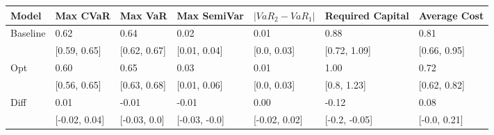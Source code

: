 \begin{tabular}{lllllll}
\toprule
   Model &      Max CVaR &      Max VaR &   Max SemiVar & $|VaR_2 - VaR_1|$ & Required Capital & Average Cost \\
\midrule
Baseline &          0.62 &         0.64 &          0.02 &              0.01 &             0.88 &         0.81 \\
         &  [0.59, 0.65] & [0.62, 0.67] &  [0.01, 0.04] &       [0.0, 0.03] &     [0.72, 1.09] & [0.66, 0.95] \\
     Opt &          0.60 &         0.65 &          0.03 &              0.01 &             1.00 &         0.72 \\
         &  [0.56, 0.65] & [0.63, 0.68] &  [0.01, 0.06] &       [0.0, 0.03] &      [0.8, 1.23] & [0.62, 0.82] \\
    Diff &          0.01 &        -0.01 &         -0.01 &              0.00 &            -0.12 &         0.08 \\
         & [-0.02, 0.04] & [-0.03, 0.0] & [-0.03, -0.0] &     [-0.02, 0.02] &    [-0.2, -0.05] & [-0.0, 0.21] \\
\bottomrule
\end{tabular}
